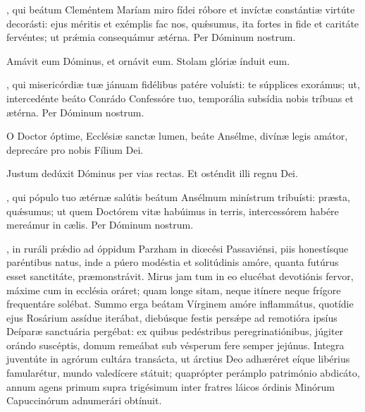 \documentclass[fontsize=9pt,paper=A6,twoside,BCOR=1mm,DIV=22,headinclude]{scrarticle}
\renewcommand\A\Ant
\begin{document}
\begin{multicols}{2}
{


\VRCii 

\BC 

, qui beátum Cleméntem Maríam miro fídei róbore et invíctæ constántiæ virtúte decorásti: ejus méritis et exémplis fac nos, qu\'æsumus, ita fortes in fide et caritáte fervéntes; ut pr\'æmia consequámur ætérna. Per Dóminum nostrum.



\VRCiii 

}

\MiiC 





\V Amávit eum Dóminus, et ornávit eum. \TPA
\R Stolam glóriæ índuit eum. \TPA 

\MiC \TPA

, qui misericórdiæ tuæ jánuam fidélibus patére voluísti: te súpplices exorámus; ut, intercedénte beáto Conrádo Confessóre tuo, temporália subsídia nobis tríbuas et ætérna. Per Dóminum nostrum.


\A O Doctor óptime, Ecclésiæ sanctæ lumen, beáte Ansélme, divínæ legis amátor, deprecáre pro nobis Fílium Dei. \TPA 

\V Justum dedúxit Dóminus per vias rectas. \TPA 
\R Et osténdit illi regnu Dei. \TPA 

, qui pópulo tuo ætérnæ salútis beátum Ansélmum minístrum tribuísti: præsta, quǽsumus; ut quem Doctórem vitæ habúimus in terris, intercessórem habére mereámur in cælis. Per Dóminum nostrum.


, in ruráli pr\'ædio ad óppidum Parzham in diœcési Passaviénsi, piis honestísque paréntibus natus, inde a púero modéstia et solitúdinis amóre, quanta futúrus esset sanctitáte, præmonstrávit. Mirus jam tum in eo elucébat devotiónis fervor, máxime cum in ecclésia oráret; quam longe sitam, neque itínere neque frígore frequentáre solébat. Summo erga beátam Vírginem amóre inflammátus, quotídie ejus Rosárium assídue iterábat, diebúsque festis pers\'æpe ad remotióra ipsíus Deíparæ sanctuária pergébat: ex quibus pedéstribus peregrinatiónibus, júgiter orándo suscéptis, domum remeábat sub vésperum fere semper jejúnus. Integra juventúte in agrórum cultára transácta, ut árctius Deo adhæréret eíque libérius famularétur, mundo valedícere státuit; quaprópter perámplo património abdicáto, annum agens primum supra trigésimum inter fratres láicos órdinis Minórum Capuccinórum adnumerári obtínuit.


\end{multicols}
\end{document}
